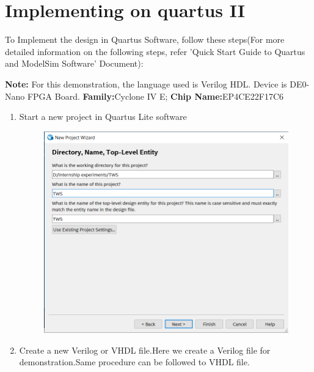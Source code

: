 \documentclass[12pt]{article}
\begin{document}
\section{Implementing on quartus II}
 To Implement the design in Quartus Software, follow these steps(For more detailed information on the following steps, refer 'Quick Start Guide to Quartus and ModelSim Software' Document):

\noindent \textbf{Note:} For this demonstration, the language used is Verilog HDL. Device is DE0-Nano FPGA Board.\newline
\hspace*{35pt}\textbf{Family:}Cyclone IV E; \textbf{Chip Name:}EP4CE22F17C6
\begin{enumerate}
    \item Start a new project in Quartus Lite software
    \begin{figure}[H]
    \centering
    \includegraphics[width=13cm,keepaspectratio]{TWS new1.png}
    \end{figure}
    \newpage
    \item Create a new Verilog or VHDL file.Here we create a Verilog file for demonstration.Same procedure can be followed to VHDL file.
    

\end{enumerate}
\end{document}
